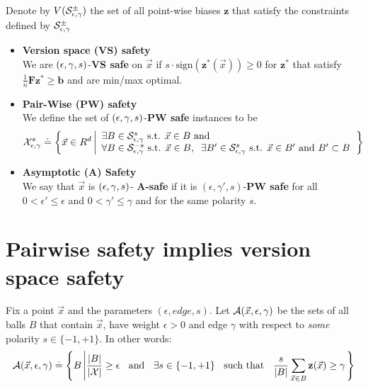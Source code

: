 \documentclass{article}
\newcommand{\X}{{\cal X}}
\newcommand{\x}{\vec{x}}
\newcommand{\vF}{\mathbf{F}}
\newcommand{\vb}{\mathbf{b}}
\newcommand{\vz}{\mathbf{z}}
\newcommand{\sign}{\text{sign}}
\begin{document}
Denote by $V({\cal S}_{\epsilon,\gamma}^{\pm})$ the set of all point-wise biases $\vz$
that satisfy the constraints defined by ${\cal S}_{\epsilon,\gamma}^{\pm}$

\newcommand{\XepsGamSig}{\X_{\epsilon,\edge}^{s}}
\newcommand{\XepsGam}{\X_{\epsilon,\edge}}
\newcommand{\XpesGamPol}{\X_{\epsilon,\edge}^{\mbox{pol}}}

\begin{itemize}
\item {\bf Version space (VS) safety}\\
We are $(\epsilon,\gamma,s)$-{\bf VS safe} on $\x$ if $s\cdot\sign(\vz^*(\x)) \geq 0$
for $\vz^*$ that satisfy  $\frac{1}{n} \vF \vz^* \geq \vb$ and are
min/max optimal.

\item
{\bf Pair-Wise (PW) safety}\\
We define the set of $(\epsilon,\gamma,s)$-{\bf PW safe} instances
to be 
\[
\XepsGamSig \doteq \left\{\x \in R^d \left|
\begin{array}{l}
\exists B \in \SepsGamSig \mbox{ s.t. } \x \in B \mbox{ and } \\
\forall B \in \SepsGamMinusSig \mbox{ s.t. } \x \in B,\;\;
\exists B' \in \SepsGamSig \mbox{ s.t. } \x \in B' \mbox{ and } B'
\subset B
\end{array}
\right. \right\}
\]

\item
{\bf Asymptotic (A) Safety}\\ We say that $\x$ is $(\epsilon,\gamma,s)$- {\bf A-safe} if
it is $(\epsilon,\gamma',s)$-{\bf PW safe} for all $0<\epsilon' \leq
\epsilon$ and $0<\gamma' \leq \gamma$ and for the same polarity $s$.
\end{itemize}


\section{Pairwise safety implies version space safety}

\newcommand{\AllSet}{{\cal A}(\x,\epsilon,\edge)}
\newcommand{\MinSet}{{\cal M}(\x,\epsilon,\edge)}

Fix a point $\x$ and the parameters $(\epsilon,edge,s)$.
Let $\AllSet$ be the sets of all balls $B$ that contain $\x$, have weight $\epsilon>0$
and edge $\gamma$ with respect to {\em some} polarity $s \in
\{-1,+1\}$. In other words:
\[
\AllSet \doteq \left\{ B \left|
\frac{|B|}{|\X|} \geq \epsilon\;\;\mbox{ and }\;\;
\exists s \in \{-1,+1\}\;\; \mbox{ such that }\;\; \frac{s}{|B|}
\sum_{\x \in B} \vz(\x) \geq \edge \right. \right\}
\]
\end{document}
